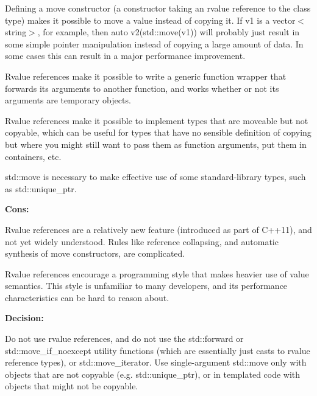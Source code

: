 \begin{DoxyItemize}
\item Defining a move constructor (a constructor taking an rvalue reference to the class type) makes it possible to move a value instead of copying it. If {\ttfamily v1} is a {\ttfamily vector$<$string$>$}, for example, then {\ttfamily auto v2(std\+::move(v1))} will probably just result in some simple pointer manipulation instead of copying a large amount of data. In some cases this can result in a major performance improvement.
\item Rvalue references make it possible to write a generic function wrapper that forwards its arguments to another function, and works whether or not its arguments are temporary objects.
\item Rvalue references make it possible to implement types that are moveable but not copyable, which can be useful for types that have no sensible definition of copying but where you might still want to pass them as function arguments, put them in containers, etc.
\item {\ttfamily std\+::move} is necessary to make effective use of some standard-\/library types, such as {\ttfamily std\+::unique\+\_\+ptr}.
\end{DoxyItemize}

{\bfseries Cons\+:}


\begin{DoxyItemize}
\item Rvalue references are a relatively new feature (introduced as part of C++11), and not yet widely understood. Rules like reference collapsing, and automatic synthesis of move constructors, are complicated.
\item Rvalue references encourage a programming style that makes heavier use of value semantics. This style is unfamiliar to many developers, and its performance characteristics can be hard to reason about.
\end{DoxyItemize}

{\bfseries Decision\+:}

Do not use rvalue references, and do not use the {\ttfamily std\+::forward} or {\ttfamily std\+::move\+\_\+if\+\_\+noexcept} utility functions (which are essentially just casts to rvalue reference types), or {\ttfamily std\+::move\+\_\+iterator}. Use single-\/argument {\ttfamily std\+::move} only with objects that are not copyable (e.\+g. {\ttfamily std\+::unique\+\_\+ptr}), or in templated code with objects that might not be copyable.

